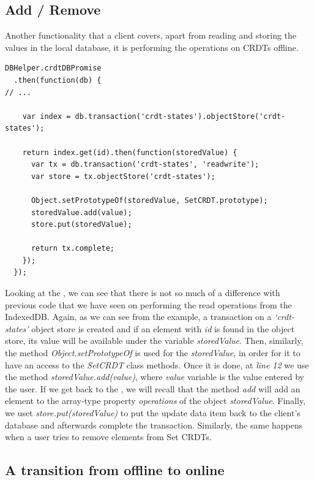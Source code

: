 \subsection*{Add / Remove}

Another functionality that a client covers, apart from reading and storing the values in the local database, it is performing the operations on CRDTs offline.

\begin{lstlisting}[caption={Performing an operation \textit{add} on a Set CRDT while the client is offline.}, label={lst:dev11}]
DBHelper.crdtDBPromise
  .then(function(db) {
// ...

    var index = db.transaction('crdt-states').objectStore('crdt-states');

    return index.get(id).then(function(storedValue) {
      var tx = db.transaction('crdt-states', 'readwrite');
      var store = tx.objectStore('crdt-states');

      Object.setPrototypeOf(storedValue, SetCRDT.prototype);
      storedValue.add(value);
      store.put(storedValue);

      return tx.complete;
    });
  });
\end{lstlisting}

Looking at the , we can see that there is not so much of a difference with previous code that we have seen on performing the read operations from the IndexedDB. Again, as we can see from the example, a transaction on a \textit{`crdt-states'} object store is created and if an element with \textit{id} is found in the object store, its value will be available under the variable \textit{storedValue}. Then, similarly, the method \textit{Object.setPrototypeOf} is used for the \textit{storedValue}, in order for it to have an access to the \textit{SetCRDT} class methods. Once it is done, at \textit{line 12} we use the method \textit{storedValue.add(value)}, where \textit{value} variable is the value entered by the user. If we get back to the , we will recall that the method \textit{add} will add an element to the array-type property \textit{operations} of the object \textit{storedValue}. Finally, we uset \textit{store.put(storedValue)} to put the update data item back to the client's database and afterwards complete the transaction. Similarly, the same happens when a user tries to remove elements from Set CRDTs.

\subsection*{A transition from offline to online}

